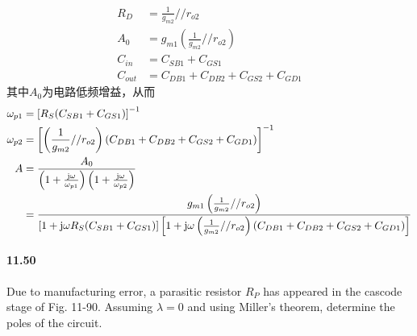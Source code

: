 \documentclass[hyperref, UTF8]{ctexart}
\newcommand{\under}[1]{\frac{1}{#1}}
\newcommand{\J}{{\rm j}}
\begin{document}
    \begin{align*}
        R_D & = \under{g_{m2}} // r_{o2} \\
        A_0 & = g_{m1}\left(\under{g_{m2}} // r_{o2}\right) \\
        C_{in} & = C_{SB1}+C_{GS1} \\
        C_{out} & = C_{DB1}+C_{DB2}+C_{GS2}+C_{GD1}
    \end{align*}
    其中$A_0$为电路低频增益，从而
    \begin{align*}
        \omega_{p1} & = \left[ R_S 
            (C_{SB1}+C_{GS1})
            \right] ^ {-1} \\
        \omega_{p2} & = \left[ \left(\under{g_{m2}} // r_{o2}\right)
            (C_{DB1}+C_{DB2}+C_{GS2}+C_{GD1})
            \right] ^ {-1}\\
        A & = \frac{A_0}{
            \left( 1 + \frac{\J \omega}{\omega_{p1}}
            \right)
            \left( 1 + \frac{\J \omega}{\omega_{p2}} \right)
        } \\
        & = \frac{g_{m1}\left(\under{g_{m2}} // r_{o2}\right)}{
            \left[ 1 + \J \omega R_S 
            (C_{SB1}+C_{GS1}) \right]
            \left[ 1 + \J \omega \left(\under{g_{m2}} // r_{o2}\right)
            (C_{DB1}+C_{DB2}+C_{GS2}+C_{GD1}) \right]
        }
    \end{align*}

\paragraph{11.50} \label{11.50}
    Due to manufacturing error, a parasitic resistor $R_P$ has appeared in the cascode stage of Fig. 11-90. Assuming $\lambda = 0$ and using Miller's theorem, determine the poles of the circuit.
\end{document}
